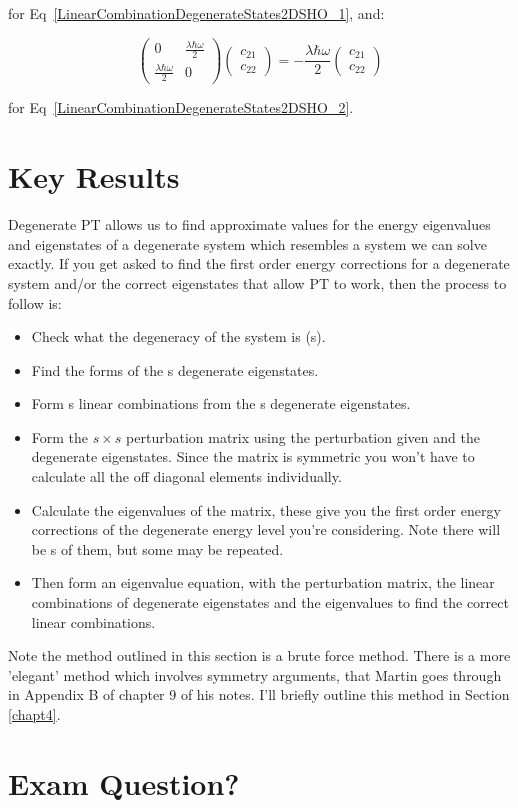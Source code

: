 \noindent for Eq~\ref{LinearCombinationDegenerateStates2DSHO_1}, and:

\begin{equation}
    \begin{pmatrix} 0 & \frac{\lambda \hbar \omega}{2} \\ \frac{\lambda \hbar \omega}{2} & 0 \end{pmatrix} \begin{pmatrix} c_{21} \\ c_{22} \end{pmatrix} = - \frac{\lambda \hbar \omega}{2} \begin{pmatrix} c_{21} \\ c_{22} \end{pmatrix}
\end{equation}

\noindent for Eq~\ref{LinearCombinationDegenerateStates2DSHO_2}.

\section{Key Results}
Degenerate PT allows us to find approximate values for the energy eigenvalues and eigenstates of a degenerate system which resembles a system we can solve exactly. If you get asked to find the first order energy corrections for a degenerate system and/or the correct eigenstates that allow PT to work, then the process to follow is:

\begin{itemize}
    \item Check what the degeneracy of the system is (s).
    \item Find the forms of the s degenerate eigenstates.
    \item Form s linear combinations from the s degenerate eigenstates.
    \item Form the $s \times s$ perturbation matrix using the perturbation given and the degenerate eigenstates. Since the matrix is symmetric you won't have to calculate all the off diagonal elements individually.
    \item Calculate the eigenvalues of the matrix, these give you the first order energy corrections of the degenerate energy level you're considering. Note there will be s of them, but some may be repeated.
    \item Then form an eigenvalue equation, with the perturbation matrix, the linear combinations of degenerate eigenstates and the eigenvalues to find the correct linear combinations.
\end{itemize}

\noindent Note the method outlined in this section is a brute force method. There is a more 'elegant' method which involves symmetry arguments, that Martin goes through in Appendix B of chapter 9 of his notes. I'll briefly outline this method in Section \ref{chapt4}.

\section{Exam Question?}


